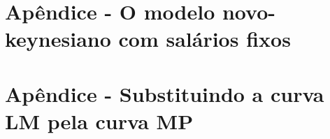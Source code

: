 \documentclass[a4paper,11pt]{book}
\theoremstyle{definition}
\begin{document}
\chapter{Apêndice - O modelo novo-keynesiano com salários fixos}

\chapter{Apêndice - Substituindo a curva LM pela curva MP}
\end{document}
